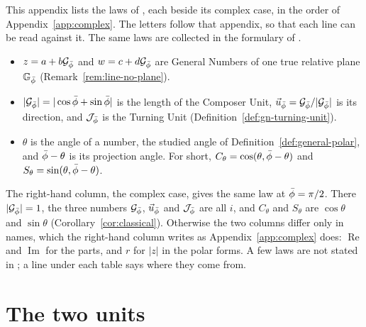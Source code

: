 This appendix lists the laws of , each beside its complex case, in the order of Appendix~\ref{app:complex}. The letters follow that appendix, so that each line can be read against it. The same laws are collected in the formulary of \citet[Appendix~A]{DerrazGNPreprint2026}.
\begin{itemize}
  \item $z = a + b\mathcal{G}_{\bar{\phi}}$ and $w = c + d\mathcal{G}_{\bar{\phi}}$ are General Numbers of one true relative plane $\mathbb{G}_{\bar{\phi}}$ (Remark~\ref{rem:line-no-plane}).
  \item $|\mathcal{G}_{\bar{\phi}}| = |\cos\bar{\phi} + \sin\bar{\phi}|$ is the length of the Composer Unit, $\vec{u}_{\bar{\phi}} = \mathcal{G}_{\bar{\phi}}/|\mathcal{G}_{\bar{\phi}}|$ is its direction, and $\mathcal{J}_{\bar{\phi}}$ is the Turning Unit (Definition~\ref{def:gn-turning-unit}).
  \item $\theta$ is the angle of a number, the studied angle of Definition~\ref{def:general-polar}, and $\bar{\phi} - \theta$ is its projection angle. For short, $C_\theta = \cos(\theta, \bar{\phi} - \theta)$ and $S_\theta = \sin(\theta, \bar{\phi} - \theta)$.
\end{itemize}
The right-hand column, the complex case, gives the same law at $\bar{\phi} = \pi/2$. There $|\mathcal{G}_{\bar{\phi}}| = 1$, the three numbers $\mathcal{G}_{\bar{\phi}}$, $\vec{u}_{\bar{\phi}}$ and $\mathcal{J}_{\bar{\phi}}$ are all $i$, and $C_\theta$ and $S_\theta$ are $\cos\theta$ and $\sin\theta$ (Corollary~\ref{cor:classical}). Otherwise the two columns differ only in names, which the right-hand column writes as Appendix~\ref{app:complex} does: $\operatorname{Re}$ and $\operatorname{Im}$ for the parts, and $r$ for $|z|$ in the polar forms. A few laws are not stated in ; a line under each table says where they come from.

\section{The two units}\label{app:f-units}

